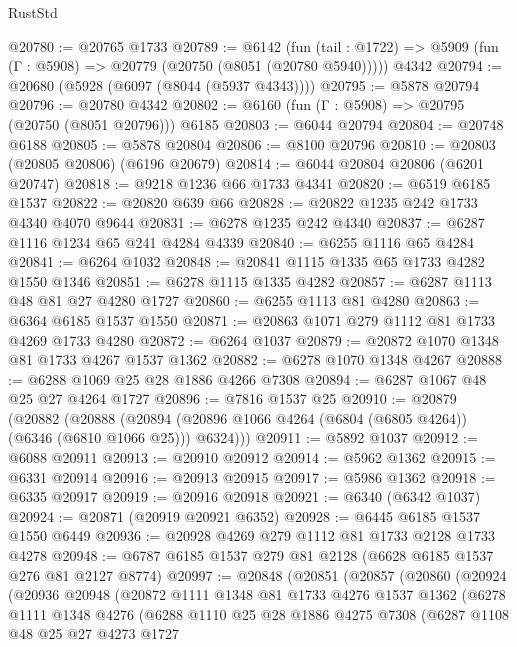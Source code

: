 \begin{lexlean}{RustStd}
\begin{coremodule}
@20780 := @20765 @1733
@20789 := @6142
    (fun (tail : @1722) => @5909 (fun (Γ : @5908) => @20779 (@20750 (@8051 (@20780 @5940)))))
    @4342
@20794 := @20680 (@5928 (@6097 (@8044 (@5937 @4343))))
@20795 := @5878 @20794
@20796 := @20780 @4342
@20802 := @6160 (fun (Γ : @5908) => @20795 (@20750 (@8051 @20796))) @6185
@20803 := @6044 @20794
@20804 := @20748 @6188
@20805 := @5878 @20804
@20806 := @8100 @20796
@20810 := @20803 (@20805 @20806) (@6196 @20679)
@20814 := @6044 @20804 @20806 (@6201 @20747)
@20818 := @9218 @1236 @66 @1733 @4341
@20820 := @6519 @6185 @1537
@20822 := @20820 @639 @66
@20828 := @20822 @1235 @242 @1733 @4340 @4070 @9644
@20831 := @6278 @1235 @242 @4340
@20837 := @6287 @1116 @1234 @65 @241 @4284 @4339
@20840 := @6255 @1116 @65 @4284
@20841 := @6264 @1032
@20848 := @20841 @1115 @1335 @65 @1733 @4282 @1550 @1346
@20851 := @6278 @1115 @1335 @4282
@20857 := @6287 @1113 @48 @81 @27 @4280 @1727
@20860 := @6255 @1113 @81 @4280
@20863 := @6364 @6185 @1537 @1550
@20871 := @20863 @1071 @279 @1112 @81 @1733 @4269 @1733 @4280
@20872 := @6264 @1037
@20879 := @20872 @1070 @1348 @81 @1733 @4267 @1537 @1362
@20882 := @6278 @1070 @1348 @4267
@20888 := @6288 @1069 @25 @28 @1886 @4266 @7308
@20894 := @6287 @1067 @48 @25 @27 @4264 @1727
@20896 := @7816 @1537 @25
@20910 := @20879
    (@20882
      (@20888 (@20894 (@20896 @1066 @4264 (@6804 (@6805 @4264)) (@6346 (@6810 @1066 @25))) @6324)))
@20911 := @5892 @1037
@20912 := @6088 @20911
@20913 := @20910 @20912
@20914 := @5962 @1362
@20915 := @6331 @20914
@20916 := @20913 @20915
@20917 := @5986 @1362
@20918 := @6335 @20917
@20919 := @20916 @20918
@20921 := @6340 (@6342 @1037)
@20924 := @20871 (@20919 @20921 @6352)
@20928 := @6445 @6185 @1537 @1550 @6449
@20936 := @20928 @4269 @279 @1112 @81 @1733 @2128 @1733 @4278
@20948 := @6787 @6185 @1537 @279 @81 @2128 (@6628 @6185 @1537 @276 @81 @2127 @8774)
@20997 := @20848
    (@20851
      (@20857
        (@20860
          (@20924
            (@20936
              @20948
              (@20872
                @1111
                @1348
                @81
                @1733
                @4276
                @1537
                @1362
                (@6278
                  @1111
                  @1348
                  @4276
                  (@6288
                    @1110
                    @25
                    @28
                    @1886
                    @4275
                    @7308
                    (@6287
                      @1108
                      @48
                      @25
                      @27
                      @4273
                      @1727

\end{coremodule}
\end{lexlean}
